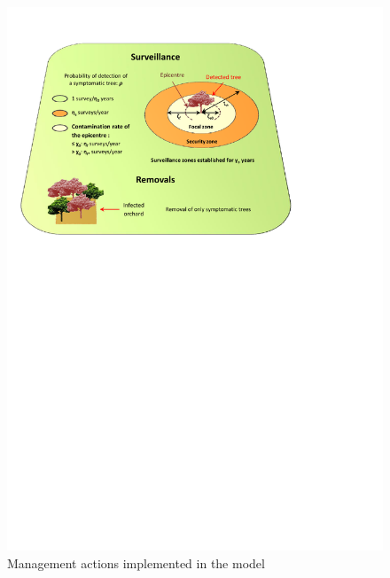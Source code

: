 \begin{figure}[!ht]
	\centering
\includegraphics[trim = 0cm 16cm 4cm 1cm, clip]{Figures_Warping_paras_de_gestion.pdf}
 \caption{Management actions implemented in the model}\label{fig:schemagestion}
\end{figure}

